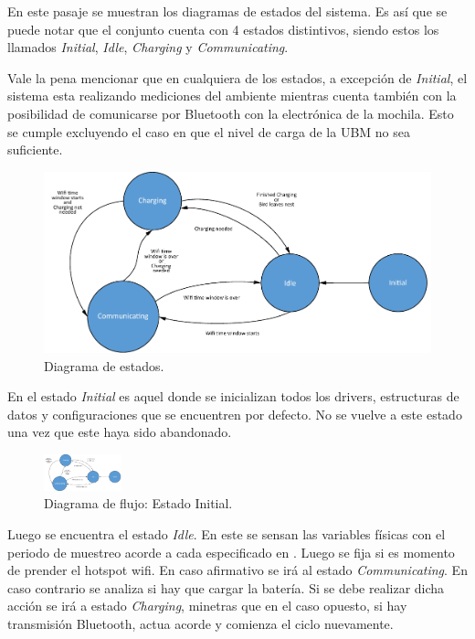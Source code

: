 En este pasaje se muestran los diagramas de estados del sistema. Es así que se puede notar que el conjunto cuenta con 4 estados distintivos, siendo estos los llamados \textit{Initial}, \textit{Idle}, \textit{Charging} y \textit{Communicating}.

Vale la pena mencionar que en cualquiera de los estados, a excepción de \textit{Initial}, el sistema esta realizando mediciones del ambiente mientras cuenta también con la posibilidad de comunicarse por Bluetooth con la electrónica de la mochila. Esto se cumple excluyendo el caso en que el nivel de carga de la UBM no sea suficiente.

\begin{figure}[H]
	\centering
	\includegraphics[width=\textwidth, page=1]{ImagenesIngenieria de Detalle/FlowChart.pdf}	
	\caption{Diagrama de estados.}
	\label{fig:Diagrama_de_Estados}
\end{figure}

En el estado \textit{Initial} es aquel donde se inicializan todos los drivers, estructuras de datos y configuraciones que se encuentren por defecto. No se vuelve a este estado una vez que este haya sido abandonado. 

\begin{figure}[H]
	\centering
	\includegraphics[width=0.2\textwidth, page=5]{ImagenesIngenieria de Detalle/FlowChart.pdf}	
	\caption{Diagrama de flujo: Estado Initial.}
	\label{fig:Diagrama_de_flujo_init}
\end{figure}

Luego se encuentra el estado \textit{Idle}. En este se sensan las variables físicas con el periodo de muestreo acorde a cada especificado en . Luego se fija si es momento de prender el hotspot wifi. En caso afirmativo se irá al estado \textit{Communicating}. En caso contrario se analiza si hay que cargar la batería. Si se debe realizar dicha acción se irá a estado \textit{Charging}, minetras que en el caso opuesto, si hay transmisión Bluetooth, actua acorde y comienza el ciclo nuevamente.

